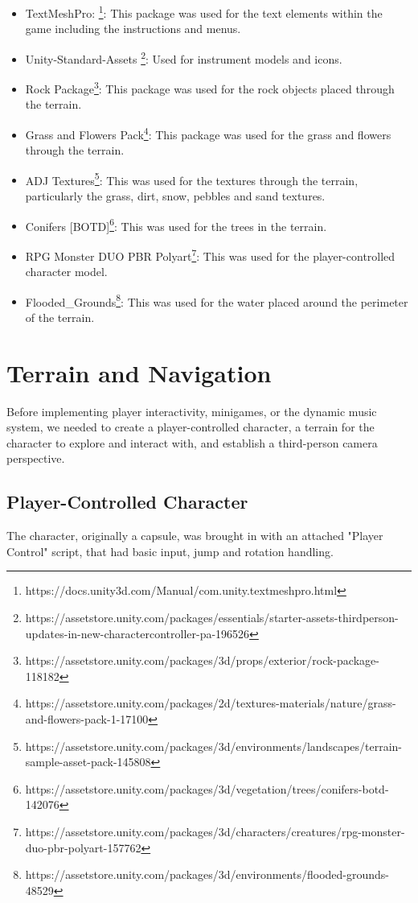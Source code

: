 \documentclass{l4proj}
\begin{document}
\begin{itemize}
    \item TextMeshPro: \footnote{https://docs.unity3d.com/Manual/com.unity.textmeshpro.html}: This package was used for the text elements within the game including the instructions and menus.
    \item Unity-Standard-Assets \footnote{https://assetstore.unity.com/packages/essentials/starter-assets-thirdperson-updates-in-new-charactercontroller-pa-196526}: Used for instrument models and icons.
    \item Rock Package\footnote{https://assetstore.unity.com/packages/3d/props/exterior/rock-package-118182}: This package was used for the rock objects placed through the terrain.
    \item Grass and Flowers Pack\footnote{https://assetstore.unity.com/packages/2d/textures-materials/nature/grass-and-flowers-pack-1-17100}: This package was used for the grass and flowers through the terrain.
    \item ADJ Textures\footnote{https://assetstore.unity.com/packages/3d/environments/landscapes/terrain-sample-asset-pack-145808}: This was used for the textures through the terrain, particularly the grass, dirt, snow, pebbles and sand textures.
    \item Conifers [BOTD]\footnote{https://assetstore.unity.com/packages/3d/vegetation/trees/conifers-botd-142076}: This was used for the trees in the terrain.
    \item RPG Monster DUO PBR Polyart\footnote{https://assetstore.unity.com/packages/3d/characters/creatures/rpg-monster-duo-pbr-polyart-157762}: This was used for the player-controlled character model.
    \item Flooded\_Grounds\footnote{https://assetstore.unity.com/packages/3d/environments/flooded-grounds-48529}: This was used for the water placed around the perimeter of the terrain.
\end{itemize}

\section{Terrain and Navigation}
Before implementing player interactivity, minigames, or the dynamic music system, we needed to create a player-controlled character, a terrain for the character to explore and interact with, and establish a third-person camera perspective.

\subsection{Player-Controlled Character}\label{sec:player_script}
The character, originally a capsule, was brought in with an attached "Player Control" script, that had basic input, jump and rotation handling.
\end{document}
